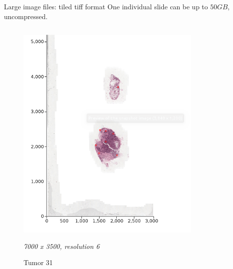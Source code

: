 \documentclass{beamer}
\begin{document}
\begin{frame}{Large image files: tiled tiff format}
One individual slide can be up to $50 GB$, uncompressed.
\begin{columns}[T] %
\begin{column}{.3\textwidth}
\begin{figure}[!ht]
\centering
\includegraphics[width=\textwidth]{Tumor_31.png}
\caption{Tumor 31}
\textit{7000 x 3500, resolution 6}
\label{}
\end{figure}
\end{column}%
\hfill%
\begin{column}{.3\textwidth}
\begin{figure}[!ht]
\centering

\end{figure}
\end{column}
\end{columns}
\end{frame}
\end{document}
